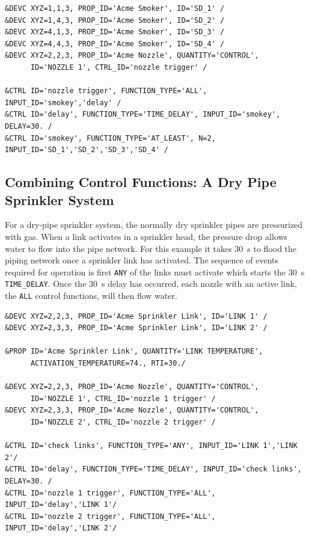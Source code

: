 \documentclass[11pt]{book}
\newcommand{\ct}{\tt\small}
\begin{document}
\footnotesize
\begin{verbatim}
&DEVC XYZ=1,1,3, PROP_ID='Acme Smoker', ID='SD_1' /
&DEVC XYZ=1,4,3, PROP_ID='Acme Smoker', ID='SD_2' /
&DEVC XYZ=4,1,3, PROP_ID='Acme Smoker', ID='SD_3' /
&DEVC XYZ=4,4,3, PROP_ID='Acme Smoker', ID='SD_4' /
&DEVC XYZ=2,2,3, PROP_ID='Acme Nozzle', QUANTITY='CONTROL',
      ID='NOZZLE 1', CTRL_ID='nozzle trigger' /

&CTRL ID='nozzle trigger', FUNCTION_TYPE='ALL', INPUT_ID='smokey','delay' /
&CTRL ID='delay', FUNCTION_TYPE='TIME_DELAY', INPUT_ID='smokey', DELAY=30. /
&CTRL ID='smokey', FUNCTION_TYPE='AT_LEAST', N=2, INPUT_ID='SD_1','SD_2','SD_3','SD_4' /
\end{verbatim}
\normalsize

\subsection{Combining Control Functions: A Dry Pipe Sprinkler System}
\label{info:dry_pipe}

For a dry-pipe sprinkler system, the normally
dry sprinkler pipes are pressurized with gas.  When a link activates in a sprinkler head, the pressure drop allows
water to flow into the pipe network.  For this example it takes 30~s to flood the piping network once a sprinkler link
has activated.  The sequence of events required for operation is first {\ct ANY} of the links must activate which
starts the 30~s {\ct TIME\_DELAY}.  Once the 30~s delay has occurred, each nozzle with an active link, the {\ct ALL}
control functions, will then flow water.

\footnotesize
\begin{verbatim}
&DEVC XYZ=2,2,3, PROP_ID='Acme Sprinkler Link', ID='LINK 1' /
&DEVC XYZ=2,3,3, PROP_ID='Acme Sprinkler Link', ID='LINK 2' /

&PROP ID='Acme Sprinkler Link', QUANTITY='LINK TEMPERATURE',
      ACTIVATION_TEMPERATURE=74., RTI=30./

&DEVC XYZ=2,2,3, PROP_ID='Acme Nozzle', QUANTITY='CONTROL',
      ID='NOZZLE 1', CTRL_ID='nozzle 1 trigger' /
&DEVC XYZ=2,3,3, PROP_ID='Acme Nozzle', QUANTITY='CONTROL',
      ID='NOZZLE 2', CTRL_ID='nozzle 2 trigger' /

&CTRL ID='check links', FUNCTION_TYPE='ANY', INPUT_ID='LINK 1','LINK 2'/
&CTRL ID='delay', FUNCTION_TYPE='TIME_DELAY', INPUT_ID='check links', DELAY=30. /
&CTRL ID='nozzle 1 trigger', FUNCTION_TYPE='ALL', INPUT_ID='delay','LINK 1'/
&CTRL ID='nozzle 2 trigger', FUNCTION_TYPE='ALL', INPUT_ID='delay','LINK 2'/
\end{verbatim}
\normalsize
\end{document}
